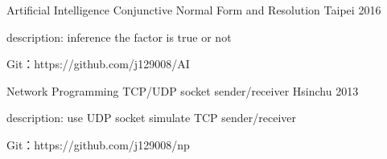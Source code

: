 
\begin{cventries}

  \cventry
    {Artificial Intelligence}
    {Conjunctive Normal Form and Resolution}
    {Taipei} %
    {2016} %
    {
      \begin{cvitems} %
        \item {description: inference the factor is true or not}
        \item {Git：https://github.com/j129008/AI}
      \end{cvitems}
    }


  \cventry
    {Network Programming}
    {TCP/UDP socket sender/receiver}
    {Hsinchu} %
    {2013} %
    {
      \begin{cvitems} %
        \item {description: use UDP socket simulate TCP sender/receiver}
        \item {Git：https://github.com/j129008/np}
      \end{cvitems}
    }

\end{cventries}
